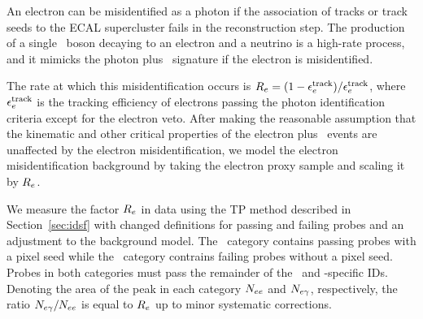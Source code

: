 An electron can be misidentified as a photon if the association of
tracks or track seeds to the ECAL supercluster fails in the
reconstruction step. 
The production of a single \PW\ boson decaying to an electron and a neutrino is a high-rate process, and it mimicks the photon plus \met\ signature if the electron is misidentified.

The rate  at which this misidentification occurs is $R_{{e}} = (1 - \epsilon_{{e}}^{\text{track}}) / \epsilon_{{e}}^{\text{track}}$, where $\epsilon_{{e}}^{\text{track}}$ is the tracking efficiency of electrons passing the photon identification criteria except for the electron veto.
After making the reasonable assumption that the kinematic and other
critical properties of the electron plus \met\ events are unaffected
by the electron misidentification, we model the electron
misidentification background by taking the electron proxy sample and
scaling it by $R_{{e}}$.


We measure the factor $R_{{e}}$ in data using the TP method described in Section~\ref{sec:idsf} with changed definitions for passing and failing probes and an adjustment to the background model.
The \Pe\Pe\ category contains passing probes with a pixel seed while
the \Pe\Pgg\ category contrains failing probes without a pixel seed. 
Probes in both categories must pass the remainder of the \egamma\ and \Pgg-specific IDs.
Denoting the area of the peak in each category  $N_{{e}{e}}$ and $N_{{e}\gamma}$, respectively, the ratio $N_{{e}\gamma} / N_{{e}{e}}$ is equal to $R_{{e}}$ up to minor systematic corrections.

